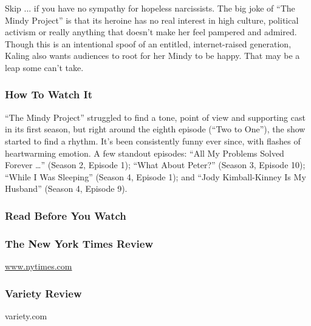 Skip ... if you have no sympathy for hopeless narcissists. The big joke
of ``The Mindy Project'' is that its heroine has no real interest in
high culture, political activism or really anything that doesn't make
her feel pampered and admired. Though this is an intentional spoof of an
entitled, internet-raised generation, Kaling also wants audiences to
root for her Mindy to be happy. That may be a leap some can't take.

\hypertarget{how-to-watch-it}{%
\subsubsection{How To Watch It}\label{how-to-watch-it}}

``The Mindy Project'' struggled to find a tone, point of view and
supporting cast in its first season, but right around the eighth episode
(``Two to One''), the show started to find a rhythm. It's been
consistently funny ever since, with flashes of heartwarming emotion. A
few standout episodes: ``All My Problems Solved Forever \ldots'' (Season
2, Episode 1); ``What About Peter?'' (Season 3, Episode 10); ``While I
Was Sleeping'' (Season 4, Episode 1); and ``Jody Kimball-Kinney Is My
Husband'' (Season 4, Episode 9).

\hypertarget{read-before-you-watch}{%
\subsubsection{Read Before You Watch}\label{read-before-you-watch}}

\href{http://www.nytimes.com/2012/09/25/arts/television/the-mindy-project-and-ben-and-kate-new-fox-series.html}{}

\hypertarget{the-new-york-times-review}{%
\subsubsection{The New York Times
Review}\label{the-new-york-times-review}}

\href{http://www.nytimes.com}{www.nytimes.com}

\href{http://variety.com/2012/tv/reviews/the-mindy-project-1117948409/}{}

\hypertarget{variety-review}{%
\subsubsection{Variety Review}\label{variety-review}}

variety.com

